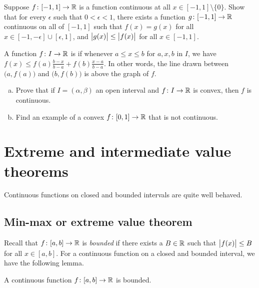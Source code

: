 \begin{exercise}
Suppose $f \colon [-1,1] \to {\mathbb{R}}$ is a function continuous at all $x \in
[-1,1] \setminus \{ 0 \}$.  Show that for every $\epsilon$ such
that $0 < \epsilon < 1$, there exists
a function $g \colon [-1,1] \to {\mathbb{R}}$ continuous on all of $[-1,1]$ such that
$f(x) = g(x)$ for all $x \in [-1,-\epsilon] \cup [\epsilon,1]$, and 
$\bigl\lvert {g(x)} \bigr\rvert \leq \bigl\lvert {f(x)} \bigr\rvert$ for all $x \in [-1,1]$.
\end{exercise}

\begin{exercise}[Challenging]
A function $f \colon I \to {\mathbb{R}}$ is \emph{} if
whenever $a \leq x \leq b$ for $a,x,b$ in $I$, we have
$f(x) \leq f(a) \frac{b-x}{b-a} + f(b) \frac{x-a}{b-a}$.  In other words,
the line drawn between $\bigl(a,f(a)\bigr)$ and $\bigl(b,f(b)\bigr)$ 
is above the graph of $f$.
\begin{enumerate}[a)]
\item
Prove that
if $I = (\alpha,\beta)$ an open interval and $f \colon I \to {\mathbb{R}}$ is convex,
then $f$ is continuous.
\item
Find an example of a convex $f \colon [0,1] \to {\mathbb{R}}$ that is
not continuous.
\end{enumerate}
\end{exercise}



\sectionnewpage
\section{Extreme and intermediate value theorems}
\label{sec:minmaxint}



Continuous functions on closed and bounded intervals
are quite well behaved.

\subsection{Min-max or extreme value theorem}

Recall that $f \colon [a,b] \to {\mathbb{R}}$ is
\emph{bounded}
if there exists a $B \in {\mathbb{R}}$ such that
$\bigl\lvert {f(x)} \bigr\rvert \leq B$ for all $x \in [a,b]$.
For a continuous function on a closed and bounded interval, we have the following lemma.

\begin{lemma}
A continuous function $f \colon [a,b] \to {\mathbb{R}}$ is bounded.
\end{lemma}

